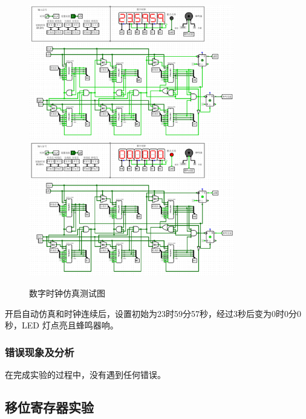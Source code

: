 \documentclass{article}
\begin{document}
    \begin{figure}[H]
    \centering
    \includegraphics[width=0.8\textwidth]{2.5.3.png}
    \includegraphics[width=0.8\textwidth]{2.5.4.png}
    \caption{数字时钟仿真测试图}
    \end{figure}
    开启自动仿真和时钟连续后，设置初始为23时59分57秒，经过3秒后变为0时0分0秒，LED 灯点亮且蜂鸣器响。

    \subsubsection{错误现象及分析}
    在完成实验的过程中，没有遇到任何错误。

    \subsection{移位寄存器实验}
\end{document}
